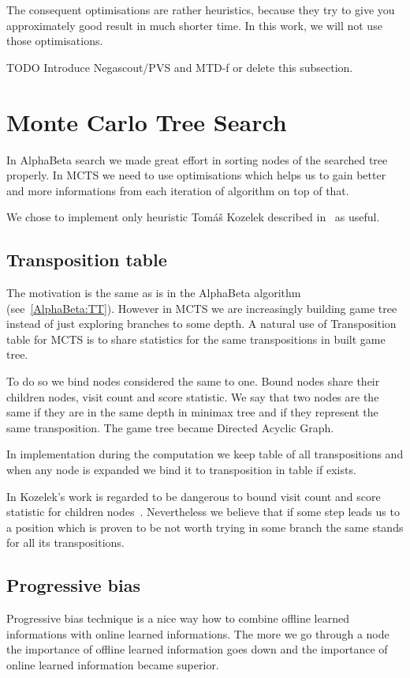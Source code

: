 The consequent optimisations are rather heuristics, because they try to
give you approximately good result in much shorter time. In this work, we
will not use those optimisations.

TODO Introduce  Negascout/PVS and MTD-f or delete this subsection.


\section{Monte Carlo Tree Search}
In AlphaBeta search we made great effort in sorting nodes of the searched tree
properly. In MCTS we need to use optimisations which helps us to gain better
and more informations from each iteration of algorithm on top of that.

We chose to implement only heuristic Tomáš Kozelek described in~\cite{KOZELEK}
as useful.

\subsection{Transposition table}
The motivation is the same as is in the AlphaBeta algorithm
(see~\ref{AlphaBeta:TT}). However in MCTS we are increasingly building game
tree instead of just exploring branches to some depth. A natural use of
Transposition table for MCTS is to share statistics for the same transpositions
in built game tree.

To do so we bind nodes considered the same to one. Bound nodes share their
children nodes, visit count and score statistic. We say that two nodes are the
same if they are in the same depth in minimax tree and if they represent the
same transposition. The game tree became Directed Acyclic Graph.

In implementation during the computation we keep table of all transpositions
and when any node is expanded we bind it to transposition in table if exists.

In Kozelek's work is regarded to be dangerous to bound visit count and score
statistic for children nodes~\cite{KOZELEK}. Nevertheless we believe that if
some step leads us to a position which is proven to be not worth trying in some
branch the same stands for all its transpositions.

\subsection{Progressive bias}
Progressive bias technique is a nice way how to combine offline learned
informations with online learned informations. The more we go through a node
the importance of offline learned information goes down and the importance of
online learned information became superior.

